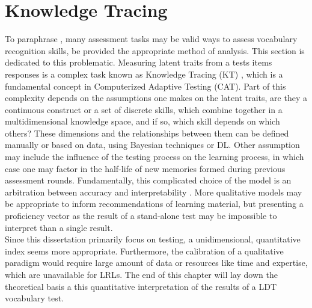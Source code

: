 \section{Knowledge Tracing}
To paraphrase \textcite{meara_complexities_1994}, many assessment tasks may be valid ways to assess vocabulary recognition skills, be provided the appropriate method of analysis. This section is dedicated to this problematic. Measuring latent traits from a tests items responses is a complex task known as Knowledge Tracing (KT) \parencite{shen_survey_2024}, which is a fundamental concept in Computerized Adaptive Testing (CAT). Part of this complexity depends on the assumptions one makes on the latent traits, are they a continuous construct or a set of discrete skills, which combine together in a multidimensional knowledge space, and if so, which skill depends on which others? These dimensions and the relationships between them can be defined manually or based on data, using Bayesian techniques or DL. Other assumption may include the influence of the testing process on the learning process, in which case one may factor in the half-life of new memories formed during previous assessment rounds. Fundamentally, this complicated choice of the model is an arbitration between accuracy and interpretability \parencite{pelanek_adaptive_2025}. More qualitative models may be appropriate to inform recommendations of learning material, but presenting a proficiency vector as the result of a stand-alone test may be impossible to interpret than a single result.\\
Since this dissertation primarily focus on testing, a unidimensional, quantitative index seems more appropriate.  Furthermore, the calibration of a qualitative paradigm would require large amount of data or resources like time and expertise, which are unavailable for LRLs. The end of this chapter will lay down the theoretical basis a this quantitative interpretation of the results of a LDT vocabulary test.

